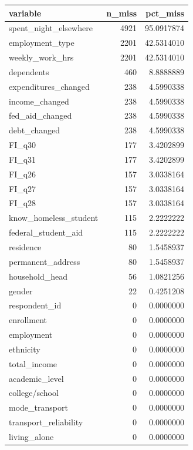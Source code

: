 \documentclass[
  10pt,
]{article}
\begin{document}
\begin{tabular}{l|r|r}
\hline
variable & n\_miss & pct\_miss\\
\hline
spent\_night\_elsewhere & 4921 & 95.0917874\\
\hline
employment\_type & 2201 & 42.5314010\\
\hline
weekly\_work\_hrs & 2201 & 42.5314010\\
\hline
dependents & 460 & 8.8888889\\
\hline
expenditures\_changed & 238 & 4.5990338\\
\hline
income\_changed & 238 & 4.5990338\\
\hline
fed\_aid\_changed & 238 & 4.5990338\\
\hline
debt\_changed & 238 & 4.5990338\\
\hline
FI\_q30 & 177 & 3.4202899\\
\hline
FI\_q31 & 177 & 3.4202899\\
\hline
FI\_q26 & 157 & 3.0338164\\
\hline
FI\_q27 & 157 & 3.0338164\\
\hline
FI\_q28 & 157 & 3.0338164\\
\hline
know\_homeless\_student & 115 & 2.2222222\\
\hline
federal\_student\_aid & 115 & 2.2222222\\
\hline
residence & 80 & 1.5458937\\
\hline
permanent\_address & 80 & 1.5458937\\
\hline
household\_head & 56 & 1.0821256\\
\hline
gender & 22 & 0.4251208\\
\hline
respondent\_id & 0 & 0.0000000\\
\hline
enrollment & 0 & 0.0000000\\
\hline
employment & 0 & 0.0000000\\
\hline
ethnicity & 0 & 0.0000000\\
\hline
total\_income & 0 & 0.0000000\\
\hline
academic\_level & 0 & 0.0000000\\
\hline
college/school & 0 & 0.0000000\\
\hline
mode\_transport & 0 & 0.0000000\\
\hline
transport\_reliability & 0 & 0.0000000\\
\hline
living\_alone & 0 & 0.0000000\\
\hline
\end{tabular}
\end{document}
